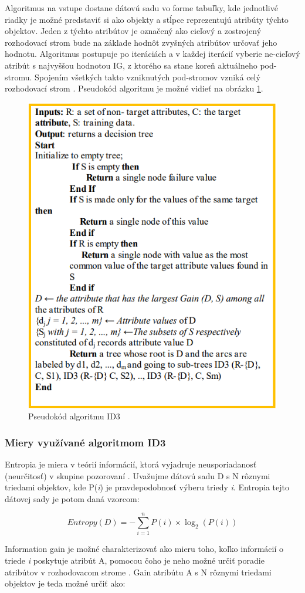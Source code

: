 \documentclass[slovak, master]{diploma}
\begin{document}
Algoritmus na vstupe dostane dátovú sadu vo forme tabuľky, kde jednotlivé riadky je možné predstaviť si ako objekty a stĺpce reprezentujú atribúty týchto objektov. Jeden z týchto atribútov je označený ako cieľový a zostrojený rozhodovací strom bude na základe hodnôt zvyšných atribútov určovať jeho hodnotu. Algoritmus postupuje po iteráciách a v každej iterácií vyberie ne-cieľový atribút s najvyššou hodnotou IG, z ktorého sa stane koreň aktuálneho pod-stromu. Spojením všetkých takto vzniknutých pod-stromov vzniká celý rozhodovací strom \cite{hssina2014comparative}. Pseudokód algoritmu je možné vidieť na obrázku \ref{pic:id3Pseudo}.

\begin{figure}[!htb]
    \centering
    \includegraphics[width=.55\textwidth]{Figures/id3Pseudo.png}
    \caption{Pseudokód algoritmu ID3 \cite{hssina2014comparative}}
    \label{pic:id3Pseudo}
\end{figure}

\subsubsection{Miery využívané algoritmom ID3}
\label{sec:ID3miery}
Entropia je miera v teórií informácií, ktorá vyjadruje neusporiadanosť (neurčitosť) v skupine pozorovaní \cite{EntropyAndGain}. Uvažujme dátovú sadu D s N rôznymi triedami objektov, kde P(\textit{i}) je pravdepodobnosť výberu triedy \textit{i}. Entropia tejto dátovej sady je potom daná vzorcom: 

\[Entropy(D) = -\displaystyle\sum\limits_{i=1}^n P(i) \times \log_2(P(i))\]

Information gain je možné charakterizovať ako mieru toho, koľko informácií o triede \textit{i} poskytuje atribút A, pomocou čoho je neho možné určiť poradie atribútov v rozhodovacom strome \cite{EntropyAndGain}. Gain atribútu A s N rôznymi triedami objektov je teda možné určiť ako:
\end{document}
